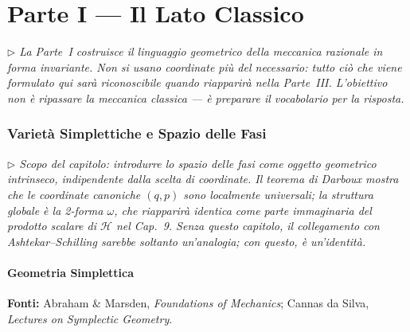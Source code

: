 \documentclass[12pt, a4paper]{article}
\newcommand{\fonti}[1]{%
	\begin{fontebox}
		\textcolor{fontecolor}{\footnotesize\textbf{Fonti:} #1}
	\end{fontebox}%
}
\newcommand{\nota}[1]{%
	\par\smallskip
	\noindent\textit{\small $\triangleright$\; #1}
	\par\smallskip
}
\begin{document}
	\newpage
	\part*{Parte I --- Il Lato Classico}
	
	\nota{La Parte~I costruisce il linguaggio geometrico della meccanica razionale in forma
		invariante. Non si usano coordinate più del necessario: tutto ciò che viene formulato
		qui sarà riconoscibile quando riapparirà nella Parte~III. L'obiettivo non è ripassare
		la meccanica classica --- è preparare il vocabolario per la risposta.}
	
	\newpage
	\section{Varietà Simplettiche e Spazio delle Fasi}
	
	\nota{Scopo del capitolo: introdurre lo spazio delle fasi come oggetto geometrico
		intrinseco, indipendente dalla scelta di coordinate. Il teorema di Darboux mostra
		che le coordinate canoniche $(q,p)$ sono localmente universali; la struttura
		globale è la 2-forma $\omega$, che riapparirà identica come parte immaginaria del
		prodotto scalare di $\mathcal{H}$ nel Cap.\ 9. Senza questo capitolo, il collegamento
		con Ashtekar--Schilling sarebbe soltanto un'analogia; con questo, è un'identità.}
	
	\subsection{Geometria Simplettica}
	
	\fonti{Abraham \& Marsden, \textit{Foundations of Mechanics}; Cannas da Silva,
		\textit{Lectures on Symplectic Geometry}.}
	
\end{document}

